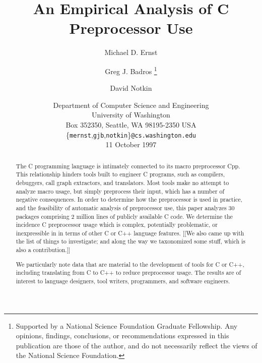 \documentclass[10pt]{article}
\def\numpackages{30}
\def\numlines{2 million}
\begin{document}
% 


\title{An Empirical Analysis of C Preprocessor Use}

\author{Michael D. Ernst%
  \and Greg J. Badros%
  \thanks{Supported by a National Science Foundation
    Graduate Fellowship. Any opinions, findings, conclusions, or
    recommendations expressed in this publication are those of the
    author, and do not necessarily reflect the views of the National
    Science Foundation.}
  \and David Notkin}

\date{%
Department of Computer Science and Engineering \\
University of Washington \\
Box 352350, Seattle, WA  98195-2350  USA \\
{\small \{{\tt mernst},{\tt gjb},{\tt notkin}\}{\tt @cs.washington.edu}} \\
11 October 1997}  

\maketitle

\begin{abstract}
  The C programming language is intimately connected to its macro
  preprocessor Cpp.  This relationship hinders tools built to engineer C
  programs, such as compilers, debuggers, call graph extractors, and
  translators.  Most tools make no attempt to analyze macro usage, but simply
  preprocess their input, which has a number of negative consequences.  In
  order to determine how the preprocessor is used in practice, and the
  feasibility of automatic analysis of preprocessor use, this paper
  analyzes {\numpackages} packages comprising {\numlines} lines of publicly
  available C code.  We determine the incidence C preprocessor usage which
  is complex, potentially problematic, or inexpressible in in terms of
  other C or C++ language features.
[[We also came up with the list of things to investigate; and along the way
we taxonomized some stuff, which is also a contribution.]]

  We particularly note data that are
  material to the development of tools for C or C++, including translating
  from C to C++ to reduce preprocessor usage.  The results are of interest
  to language designers, tool writers, programmers, and software engineers.
\end{abstract}
\end{document}
